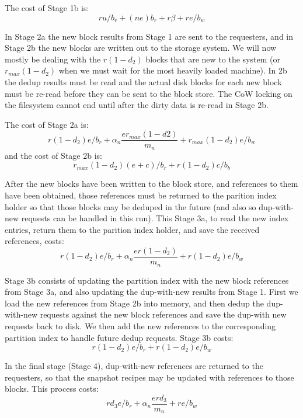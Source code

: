The cost of Stage 1b is:
\[
    r u / b_r + (n e)b_r + r \beta + r e / b_w
\]

In Stage 2a the new block results from Stage 1 are sent to the requesters, and
in Stage 2b the new blocks are written out to the storage system. We will now
mostly be dealing with the $r(1-d_2)$ blocks that are new to the system (or
$r_{max}(1-d_2)$ when we must wait for the most heavily loaded machine). In 2b
the dedup results must be read and the actual disk blocks for each new block
must be re-read before they can be sent to the block store. The CoW locking on
the filesystem cannot end until after the dirty data is re-read in Stage 2b.

The cost of Stage 2a is:
\[
    r(1-d_2)e / b_r + \alpha_n\frac{e r_{max}(1-d2)}{m_n} + r_{max}(1-d_2)e / b_w
\]
and the cost of Stage 2b is:
\[
    r_{max}(1-d_2)(e+c) / b_r + r(1-d_2)c / b_b
\]

After the new blocks have been written to the block store, and references to
them have been obtained, those references must be returned to the parition
index holder so that those blocks may be deduped in the future (and also so
dup-with-new requests can be handled in this run). This Stage 3a, to read the
new index entries, return them to the parition index holder, and save the
received references, costs:
\[
    r (1-d_2)e / b_r + \alpha_n\frac{e r(1-d_2)}{m_n} + r(1-d_2)e / b_w
\]

Stage 3b consists of updating the partition index with the new block references
from Stage 3a, and also updating the dup-with-new results from Stage 1. First
we load the new references from Stage 2b into memory, and then dedup the
dup-with-new requests against the new block references and save the dup-with
new requests back to disk. We then add the new references to the corresponding
partition index to handle future dedup requests. Stage 3b costs:
\[
    r (1-d_2)e / b_r + r(1-d_2)e / b_w
\]

In the final stage (Stage 4), dup-with-new references are returned to the
requesters, so that the snapshot recipes may be updated with references to
those blocks. This process costs:
\[
    r d_3 e / b_r + \alpha_n\frac{e r d_3}{m_n} + r e / b_w
\]

